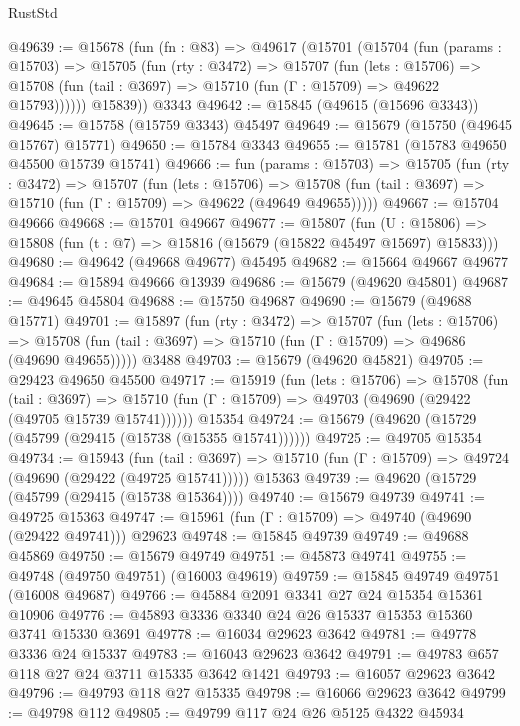\begin{lexlean}{RustStd}
\begin{coremodule}
@49639 := @15678
    (fun (fn : @83) =>
    @49617
      (@15701
        (@15704
          (fun (params : @15703) =>
          @15705
            (fun (rty : @3472) =>
            @15707
              (fun (lets : @15706) =>
              @15708 (fun (tail : @3697) => @15710 (fun (Γ : @15709) => @49622 @15793))))))
        @15839))
    @3343
@49642 := @15845 (@49615 (@15696 @3343))
@49645 := @15758 (@15759 @3343) @45497
@49649 := @15679 (@15750 (@49645 @15767) @15771)
@49650 := @15784 @3343
@49655 := @15781 (@15783 @49650 @45500 @15739 @15741)
@49666 := fun (params : @15703) =>
  @15705
    (fun (rty : @3472) =>
    @15707
      (fun (lets : @15706) =>
      @15708 (fun (tail : @3697) => @15710 (fun (Γ : @15709) => @49622 (@49649 @49655)))))
@49667 := @15704 @49666
@49668 := @15701 @49667
@49677 := @15807
    (fun (U : @15806) => @15808 (fun (t : @7) => @15816 (@15679 (@15822 @45497 @15697) @15833)))
@49680 := @49642 (@49668 @49677) @45495
@49682 := @15664 @49667 @49677
@49684 := @15894 @49666 @13939
@49686 := @15679 (@49620 @45801)
@49687 := @49645 @45804
@49688 := @15750 @49687
@49690 := @15679 (@49688 @15771)
@49701 := @15897
    (fun (rty : @3472) =>
    @15707
      (fun (lets : @15706) =>
      @15708 (fun (tail : @3697) => @15710 (fun (Γ : @15709) => @49686 (@49690 @49655)))))
    @3488
@49703 := @15679 (@49620 @45821)
@49705 := @29423 @49650 @45500
@49717 := @15919
    (fun (lets : @15706) =>
    @15708
      (fun (tail : @3697) =>
      @15710 (fun (Γ : @15709) => @49703 (@49690 (@29422 (@49705 @15739 @15741))))))
    @15354
@49724 := @15679 (@49620 (@15729 (@45799 (@29415 (@15738 (@15355 @15741))))))
@49725 := @49705 @15354
@49734 := @15943
    (fun (tail : @3697) => @15710 (fun (Γ : @15709) => @49724 (@49690 (@29422 (@49725 @15741)))))
    @15363
@49739 := @49620 (@15729 (@45799 (@29415 (@15738 @15364))))
@49740 := @15679 @49739
@49741 := @49725 @15363
@49747 := @15961 (fun (Γ : @15709) => @49740 (@49690 (@29422 @49741))) @29623
@49748 := @15845 @49739
@49749 := @49688 @45869
@49750 := @15679 @49749
@49751 := @45873 @49741
@49755 := @49748 (@49750 @49751) (@16003 @49619)
@49759 := @15845 @49749 @49751 (@16008 @49687)
@49766 := @45884 @2091 @3341 @27 @24 @15354 @15361 @10906
@49776 := @45893 @3336 @3340 @24 @26 @15337 @15353 @15360 @3741 @15330 @3691
@49778 := @16034 @29623 @3642
@49781 := @49778 @3336 @24 @15337
@49783 := @16043 @29623 @3642
@49791 := @49783 @657 @118 @27 @24 @3711 @15335 @3642 @1421
@49793 := @16057 @29623 @3642
@49796 := @49793 @118 @27 @15335
@49798 := @16066 @29623 @3642
@49799 := @49798 @112
@49805 := @49799 @117 @24 @26 @5125 @4322 @45934

\end{coremodule}
\end{lexlean}
